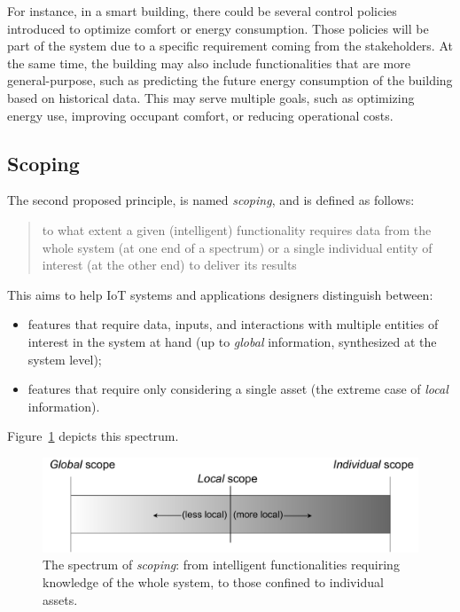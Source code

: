 For instance, in a smart building, there could be several control policies introduced to optimize comfort or energy consumption.
%
Those policies will be part of the system due to a specific requirement coming from the stakeholders.
%
At the same time, the building may also include functionalities that are more general-purpose, such as predicting the future energy consumption of the building based on historical data.
%
This may serve multiple goals, such as optimizing energy use, improving occupant comfort, or reducing operational costs.

\subsection{Scoping} 

The second proposed principle, is named \emph{scoping}, and is defined as follows:
\begin{quote}
    to what extent a given (intelligent) functionality requires data from the whole system (at one end of a spectrum) or a single individual entity of interest (at the other end) to deliver its results
\end{quote}
This aims to help IoT systems and applications designers distinguish between:
\begin{itemize}
    \item features that require data, inputs, and interactions with multiple entities of interest in the system at hand (up to \emph{global} information, synthesized at the system level);
    \item features that require only considering a single asset (the extreme case of \emph{local} information).
\end{itemize}
Figure~\ref{fig:scope} depicts this spectrum. 

\begin{figure}
    \centering
    \includegraphics[width=.6\columnwidth]{figures/dt-mas/scope-spectrum.pdf}
    \caption{The spectrum of \emph{scoping}: from intelligent functionalities requiring knowledge of the whole system, to those confined to individual assets.}
    \label{fig:scope}
    
\end{figure}


